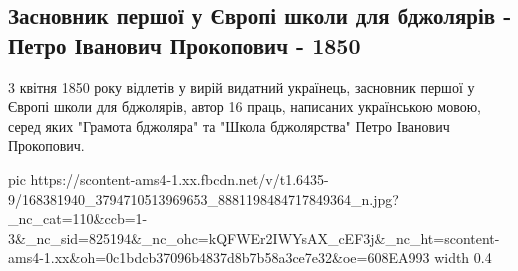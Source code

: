  
 
 
 
 

\subsection{Засновник першої у Європі школи для бджолярів - Петро Іванович Прокопович - 1850}
\label{sec:03_04_2021.fb.bondarenko_pavel.1.med_ulej_izobretatel_prokopovych_1850}

3 квітня 1850 року відлетів у вирій видатний українець, засновник першої у Європі школи для бджолярів, автор 16 праць, написаних українською мовою, серед яких "Грамота бджоляра" та "Школа бджолярства" Петро Іванович Прокопович.

\ifcmt
  pic https://scontent-ams4-1.xx.fbcdn.net/v/t1.6435-9/168381940_3794710513969653_8881198484717849364_n.jpg?_nc_cat=110&ccb=1-3&_nc_sid=825194&_nc_ohc=kQFWEr2IWYsAX_cEF3j&_nc_ht=scontent-ams4-1.xx&oh=0c1bdcb37096b4837d8b7b58a3ce7e32&oe=608EA993
  width 0.4
\fi


